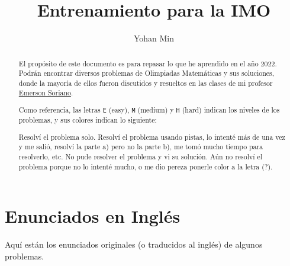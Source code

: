 \documentclass[11pt]{scrartcl}
\title{Entrenamiento para la IMO}
\author{Yohan Min}
\begin{document}
\maketitle

\begin{abstract}
	El propósito de este documento es para repasar lo que he aprendido en el año 2022. Podrán encontrar diversos problemas de Olimpiadas Matemáticas y sus soluciones, donde la mayoría de ellos fueron discutidos y resueltos en las clases de mi profesor \href{https://www.facebook.com/emerson.sorianoperez}{Emerson Soriano}.
	
	Como referencia, las letras \verb|E| (easy), \verb|M| (medium) y \verb|H| (hard) indican los niveles de los problemas, y sus colores indican lo siguiente:
	\begin{description}[labelwidth=\widthof{\texttt{aaaaa}}+1.2em,leftmargin=\widthof{\texttt{aaaaa}a}+1.2em,align=right]
		 Resolví el problema solo.
		 Resolví el problema usando pistas, lo intenté más de una vez y me salió, resolví la parte a) pero no la parte b), me tomó mucho tiempo para resolverlo, etc.
		 No pude resolver el problema y vi su solución.
		 Aún no resolví el problema porque no lo intenté mucho, o me dio pereza ponerle color a la letra (?).
	\end{description}
\end{abstract}

\tableofcontents














%
%
%
%

\section{Enunciados en Inglés}

Aquí están los enunciados originales (o traducidos al inglés) de algunos problemas.

\makehints
\clearpage
\printbibliography
\end{document}
